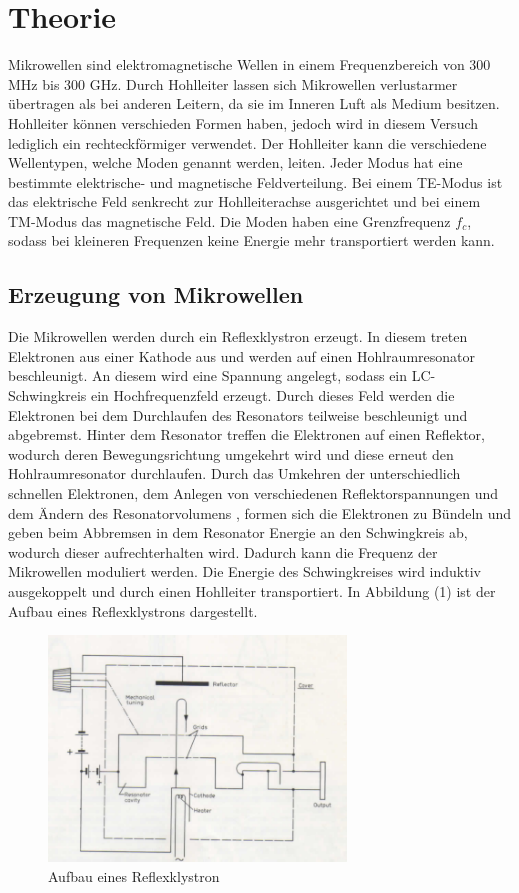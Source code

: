 \section{Theorie}
\label{sec:Theorie}
Mikrowellen sind elektromagnetische Wellen in einem Frequenzbereich von $300$ MHz bis 300 GHz. Durch
Hohlleiter lassen sich Mikrowellen verlustarmer übertragen als bei anderen Leitern, da
sie im Inneren Luft als Medium besitzen. Hohlleiter können verschieden Formen haben,
jedoch wird in diesem Versuch lediglich ein rechteckförmiger verwendet. Der Hohlleiter
kann die verschiedene Wellentypen, welche Moden genannt werden, leiten. Jeder Modus hat
eine bestimmte elektrische- und magnetische Feldverteilung. Bei einem TE-Modus ist das elektrische
Feld senkrecht zur Hohlleiterachse ausgerichtet und bei einem TM-Modus das magnetische Feld.
Die Moden haben eine Grenzfrequenz $f_c$, sodass
bei kleineren Frequenzen keine Energie mehr transportiert werden kann.

\subsection{Erzeugung von Mikrowellen}
Die Mikrowellen werden durch ein Reflexklystron erzeugt. In diesem treten Elektronen
aus einer Kathode aus und werden auf einen Hohlraumresonator beschleunigt. An diesem
wird eine Spannung angelegt, sodass ein LC-Schwingkreis ein Hochfrequenzfeld erzeugt.
Durch dieses Feld werden die Elektronen  bei dem Durchlaufen des Resonators teilweise beschleunigt und abgebremst.
Hinter dem Resonator treffen die Elektronen auf einen Reflektor, wodurch deren
Bewegungsrichtung umgekehrt wird und diese erneut den Hohlraumresonator durchlaufen.
Durch das Umkehren der unterschiedlich schnellen Elektronen, dem Anlegen von verschiedenen Reflektorspannungen und dem Ändern
des Resonatorvolumens , formen sich die Elektronen zu Bündeln und
geben beim Abbremsen in dem Resonator Energie an den Schwingkreis ab, wodurch dieser
aufrechterhalten wird. Dadurch kann die Frequenz der Mikrowellen moduliert werden. Die Energie des Schwingkreises wird induktiv ausgekoppelt und
durch einen Hohlleiter transportiert. In Abbildung (1) ist der Aufbau
eines Reflexklystrons dargestellt.

\begin{figure}[H]
  \centering
  \includegraphics[height=6cm]{klystron.PNG}
  \caption{Aufbau eines Reflexklystron \cite{sample1}}
  \label{fig:Lock}
\end{figure}

